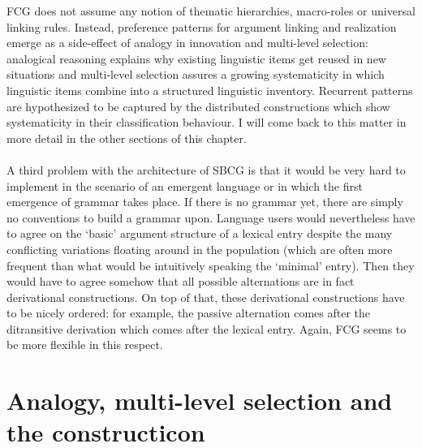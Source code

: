 FCG does not assume any notion of thematic hierarchies, macro-roles or universal linking rules. Instead, preference patterns for argument linking and realization emerge as a side-effect of analogy in innovation and multi-level selection: analogical reasoning explains why existing linguistic items get reused in new situations and multi-level selection assures a growing systematicity in which linguistic items combine into a structured linguistic inventory. Recurrent patterns are hypothesized to be captured by the distributed constructions which show systematicity in their classification behaviour. I will come back to this matter in more detail in the other sections of this chapter.
\\
\\
 A third problem with the architecture of SBCG is that it would be very hard to implement in the scenario of an emergent language or in which the first emergence of grammar takes place. If there is no grammar yet, there are simply no conventions to build a grammar upon. Language users would nevertheless have to agree on the `basic' argument structure of a lexical entry despite the many conflicting variations floating around in the population (which are often more frequent than what would be intuitively speaking the `minimal' entry). Then they would have to agree somehow that all possible alternations are in fact derivational constructions. On top of that, these derivational constructions have to be nicely ordered: for example, the passive alternation comes after the ditransitive derivation which comes after the lexical entry. Again, FCG seems to be more flexible in this respect.

\section{Analogy, multi-level selection and the constructicon}
\label{s:comp-constructicon}

